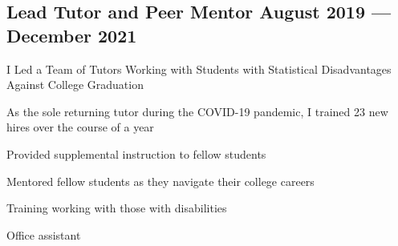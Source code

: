 \documentclass[a4paper,12pt]{article}
\begin{document}
\subsection{{Lead Tutor and Peer Mentor \hfill August 2019 --- December 2021}}
I Led a Team of Tutors Working with Students with Statistical Disadvantages Against College Graduation
\vspace*{2pt}
\begin{zitemize}
\item As the sole returning tutor during the COVID-19 pandemic, I trained 23 new hires over the course of a year
\item Provided supplemental instruction to fellow students
\item Mentored fellow students as they navigate their college careers
\item Training working with those with disabilities
\item Office assistant 
\end{zitemize}
\vspace{7pt}
\end{document}
